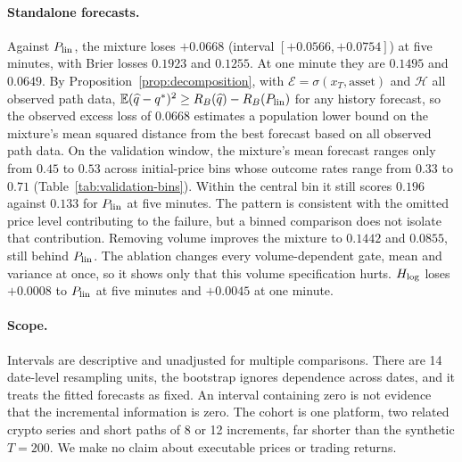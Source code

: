 \documentclass[runningheads]{llncs}
\newcommand{\E}{\mathbb E}
\begin{document}
\paragraph{Standalone forecasts.} Against $P_{\rm lin}$, the mixture loses $+0.0668$ (interval $[+0.0566,+0.0754]$) at five minutes, with Brier losses $0.1923$ and $0.1255$. At one minute they are $0.1495$ and $0.0649$. By Proposition~\ref{prop:decomposition}, with $\mathcal E=\sigma(x_T,\text{asset})$ and $\mathcal H$ all observed path data, $\E(\widehat q-q^*)^2\ge R_B(\widehat q)-R_B(P_{\rm lin})$ for any history forecast, so the observed excess loss of $0.0668$ estimates a population lower bound on the mixture's mean squared distance from the best forecast based on all observed path data. On the validation window, the mixture's mean forecast ranges only from $0.45$ to $0.53$ across initial-price bins whose outcome rates range from $0.33$ to $0.71$ (Table~\ref{tab:validation-bins}). Within the central bin it still scores $0.196$ against $0.133$ for $P_{\rm lin}$ at five minutes. The pattern is consistent with the omitted price level contributing to the failure, but a binned comparison does not isolate that contribution. Removing volume improves the mixture to $0.1442$ and $0.0855$, still behind $P_{\rm lin}$. The ablation changes every volume-dependent gate, mean and variance at once, so it shows only that this volume specification hurts. $H_{\rm log}$ loses $+0.0008$ to $P_{\rm lin}$ at five minutes and $+0.0045$ at one minute.



\paragraph{Scope.} Intervals are descriptive and unadjusted for multiple comparisons. There are 14 date-level resampling units, the bootstrap ignores dependence across dates, and it treats the fitted forecasts as fixed. An interval containing zero is not evidence that the incremental information is zero. The cohort is one platform, two related crypto series and short paths of 8 or 12 increments, far shorter than the synthetic $T=200$. We make no claim about executable prices or trading returns.
\end{document}
